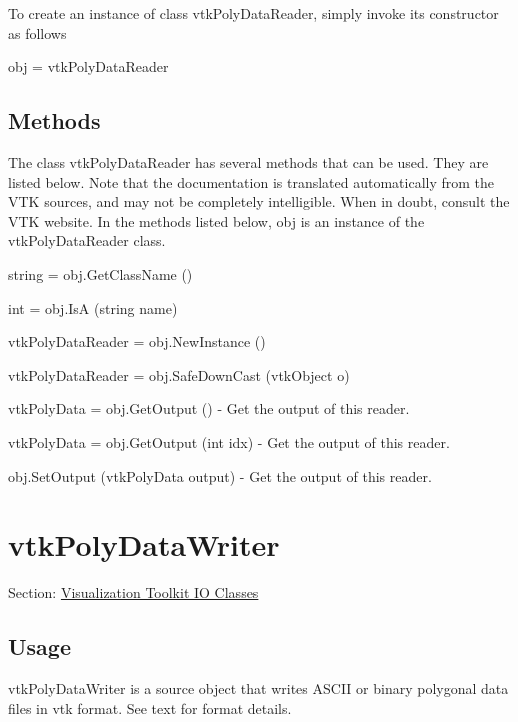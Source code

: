 To create an instance of class vtk\-Poly\-Data\-Reader, simply invoke its constructor as follows \begin{DoxyVerb}  obj = vtkPolyDataReader
\end{DoxyVerb}
 \hypertarget{vtkwidgets_vtkxyplotwidget_Methods}{}\subsection{Methods}\label{vtkwidgets_vtkxyplotwidget_Methods}
The class vtk\-Poly\-Data\-Reader has several methods that can be used. They are listed below. Note that the documentation is translated automatically from the V\-T\-K sources, and may not be completely intelligible. When in doubt, consult the V\-T\-K website. In the methods listed below, {\ttfamily obj} is an instance of the vtk\-Poly\-Data\-Reader class. 
\begin{DoxyItemize}
\item {\ttfamily string = obj.\-Get\-Class\-Name ()}  
\item {\ttfamily int = obj.\-Is\-A (string name)}  
\item {\ttfamily vtk\-Poly\-Data\-Reader = obj.\-New\-Instance ()}  
\item {\ttfamily vtk\-Poly\-Data\-Reader = obj.\-Safe\-Down\-Cast (vtk\-Object o)}  
\item {\ttfamily vtk\-Poly\-Data = obj.\-Get\-Output ()} -\/ Get the output of this reader.  
\item {\ttfamily vtk\-Poly\-Data = obj.\-Get\-Output (int idx)} -\/ Get the output of this reader.  
\item {\ttfamily obj.\-Set\-Output (vtk\-Poly\-Data output)} -\/ Get the output of this reader.  
\end{DoxyItemize}\hypertarget{vtkio_vtkpolydatawriter}{}\section{vtk\-Poly\-Data\-Writer}\label{vtkio_vtkpolydatawriter}
Section\-: \hyperlink{sec_vtkio}{Visualization Toolkit I\-O Classes} \hypertarget{vtkwidgets_vtkxyplotwidget_Usage}{}\subsection{Usage}\label{vtkwidgets_vtkxyplotwidget_Usage}
vtk\-Poly\-Data\-Writer is a source object that writes A\-S\-C\-I\-I or binary polygonal data files in vtk format. See text for format details.

